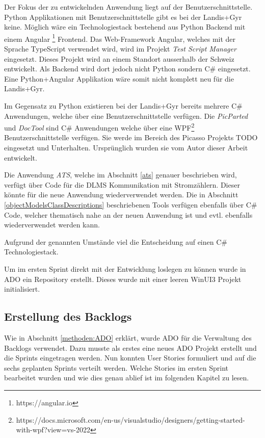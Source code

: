 Der Fokus der zu entwickelnden Anwendung liegt auf der Benutzerschnittstelle.
Python Applikationen mit Benutzerschnittstelle gibt es bei der Landis+Gyr keine.
Möglich wäre ein Technologiestack bestehend aus Python Backend mit einem Angular \footnote{https://angular.io} Frontend.
Das Web-Framework Angular, welches mit der Sprache TypeScript verwendet wird, wird im Projekt \textit{Test Script Manager} eingesetzt.
Dieses Projekt wird an einem Standort ausserhalb der Schweiz entwickelt.
Als Backend wird dort jedoch nicht Python sondern C\# eingesetzt.
Eine Python+Angular Applikation wäre somit nicht komplett neu für die Landis+Gyr.

Im Gegensatz zu Python existieren bei der Landis+Gyr bereits mehrere C\# Anwendungen, welche über eine Benutzerschnittstelle verfügen.
Die \textit{PicParted} und \textit{DocTool} sind C\# Anwendungen welche über eine \ac{WPF}\footnote{https://docs.microsoft.com/en-us/visualstudio/designers/getting-started-with-wpf?view=vs-2022} Benutzerschnittstelle verfügen.
Sie werde im Bereich des Picasso Projekts TODO eingesetzt und Unterhalten. 
Ursprünglich wurden sie vom Autor dieser Arbeit entwickelt.

Die Anwendung \textit{ATS}, welche im Abschnitt \ref{ats} genauer beschrieben wird, verfügt über Code für die \ac{DLMS} Kommunikation mit Stromzählern.
Dieser könnte für die neue Anwendung wiederverwendet werden.
Die in Abschnitt \ref{objectModelsClassDescriptions} beschriebenen Tools verfügen ebenfalls über C\# Code, welcher thematisch nahe an der neuen Anwendung ist und evtl. ebenfalls wiederverwendet werden kann.

Aufgrund der genannten Umstände viel die Entscheidung auf einen C\# Technologiestack.


Um im ersten Sprint direkt mit der Entwicklung loslegen zu können wurde in \ac{ADO} ein Repository erstellt.
Dieses wurde mit einer leeren WinUI3 Projekt initialisiert.




\subsection{Erstellung des Backlogs}
Wie in Abschnitt \ref{methoden:ADO} erklärt, wurde \ac{ADO} für die Verwaltung des Backlogs verwendet.
Dazu musste als erstes eine neues \ac{ADO} Projekt erstellt und die Sprints eingetragen werden.
Nun konnten User Stories formuliert und auf die sechs geplanten Sprints verteilt werden.
Welche Stories im ersten Sprint bearbeitet wurden und wie dies genau ablief ist im folgenden Kapitel zu lesen.

